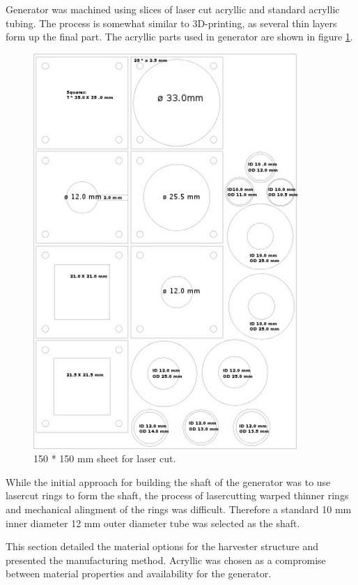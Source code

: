 Generator was machined using slices of laser cut acryllic and standard acryllic tubing. The process is somewhat similar to 3D-printing, as several thin layers form up the final part. The acryllic parts used in generator are shown in figure \ref{fig:lasercut}.

\begin{figure}[htb]
  \begin{center}
    \includegraphics[height=15cm]{images/own_dwg/mechanical/layers.jpg}
  \end{center}
  \caption{\label{fig:lasercut} 150 * 150 mm sheet for laser cut.}
\end{figure}

While the initial approach for building the shaft of the generator was to use lasercut rings to form the shaft, the process of lasercutting warped thinner rings and mechanical alingment of the rings was difficult. Therefore a standard 10 mm inner diameter 12 mm outer diameter tube was selected as the shaft.

This section detailed the material options for the harvester structure and presented the manufacturing method. Acryllic was chosen as a compromise between material properties and availability for the generator. 

